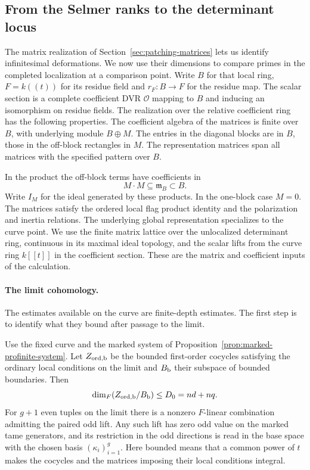 \subsection{From the Selmer ranks to the determinant locus}
\label{sec:patching-cotangent}
\hypertarget{source-ordinary-patching-cotangent}{}

The matrix realization of Section~\ref{sec:patching-matrices} lets us identify
infinitesimal deformations. We now use their dimensions to compare primes in the
completed localization at a comparison point. Write
\(B\) for that local ring, \(F=k((t))\) for its residue
field and \(r_F:B\to F\) for the residue map. The scalar
section is a complete coefficient DVR \(\mathcal O\)
mapping to \(B\) and inducing an isomorphism on residue
fields. The realization over the relative coefficient ring has the following properties. The coefficient algebra of
the matrices is finite over \(B\), with underlying module
\(B\oplus M\). The entries in the diagonal blocks are in
\(B\), those in the off-block rectangles in \(M\).
The representation matrices span all matrices with the specified pattern over \(B\).

In the product the off-block terms have coefficients in
\[
 M\cdot M\subseteq\mathfrak m_B\subset B .
\]
Write \(I_M\) for the ideal generated by these products.
In the one-block case \(M=0\).
The matrices satisfy the ordered local flag product
identity and the polarization and inertia relations.
The underlying global representation specializes to the
curve point. We use the finite matrix lattice over the
unlocalized determinant ring, continuous in its maximal
ideal topology, and the scalar lifts from the curve
ring \(k[[t]]\) in the coefficient section. These are
the matrix and coefficient inputs of the calculation.
\label{cor:ordinary-patching-cotangent-1}

\paragraph{The limit cohomology.}
The estimates available on the curve are finite-depth estimates. The first step is to
identify what they bound after passage to the limit.

\begin{lemma}\label{lem:marked-limit-cohomology}
Use the fixed curve and the marked system of
Proposition~\ref{prop:marked-profinite-system}.
Let \(Z_{\rm ord,b}\) be the bounded first-order cocycles satisfying the
ordinary local conditions on the limit and \(B_{\rm b}\) their subspace of
bounded boundaries. Then
\[
       \dim_F(Z_{\rm ord,b}/B_{\rm b})\le D_0=nd+nq .
\]
For \(g+1\) even tuples on the limit there is a nonzero
\(F\)-linear combination admitting the paired odd lift.
Any such lift has zero odd value on the marked tame generators,
and its restriction in the odd directions is read in the base
space with the chosen basis \((\kappa_i)_{i=1}^g\).
Here bounded means that a common power of \(t\) makes the
cocycles and the matrices imposing their local conditions integral.
\end{lemma}

